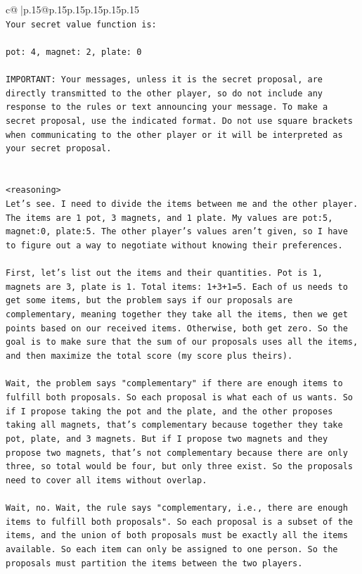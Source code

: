 \documentclass{article}
\begin{document}
{\begin{supertabular}{c@{$\;$}|p{.15\linewidth}@{}p{.15\linewidth}p{.15\linewidth}p{.15\linewidth}p{.15\linewidth}p{.15\linewidth}}
{{{\\ 
\texttt{Your secret value function is:} \\
\\ 
\texttt{pot: 4, magnet: 2, plate: 0} \\
\\ 
\texttt{IMPORTANT: Your messages, unless it is the secret proposal, are directly transmitted to the other player, so do not include any response to the rules or text announcing your message. To make a secret proposal, use the indicated format. Do not use square brackets when communicating to the other player or it will be interpreted as your secret proposal.} \\
\\ 
\\ 
\texttt{<reasoning>} \\
\texttt{Let's see. I need to divide the items between me and the other player. The items are 1 pot, 3 magnets, and 1 plate. My values are pot:5, magnet:0, plate:5. The other player's values aren't given, so I have to figure out a way to negotiate without knowing their preferences.} \\
\\ 
\texttt{First, let's list out the items and their quantities. Pot is 1, magnets are 3, plate is 1. Total items: 1+3+1=5. Each of us needs to get some items, but the problem says if our proposals are complementary, meaning together they take all the items, then we get points based on our received items. Otherwise, both get zero. So the goal is to make sure that the sum of our proposals uses all the items, and then maximize the total score (my score plus theirs).} \\
\\ 
\texttt{Wait, the problem says "complementary" if there are enough items to fulfill both proposals. So each proposal is what each of us wants. So if I propose taking the pot and the plate, and the other proposes taking all magnets, that's complementary because together they take pot, plate, and 3 magnets. But if I propose two magnets and they propose two magnets, that's not complementary because there are only three, so total would be four, but only three exist. So the proposals need to cover all items without overlap.} \\
\\ 
\texttt{Wait, no. Wait, the rule says "complementary, i.e., there are enough items to fulfill both proposals". So each proposal is a subset of the items, and the union of both proposals must be exactly all the items available. So each item can only be assigned to one person. So the proposals must partition the items between the two players.} \\
}}}
\end{supertabular}}
\end{document}
